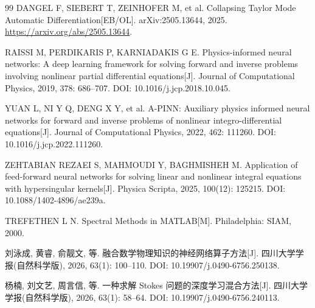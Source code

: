 \documentclass[UTF8,fontset=none,10.5pt,a4paper]{ctexart}
\numberwithin{equation}{section}
\begin{document}
\begin{thebibliography}{99}
DANGEL F, SIEBERT T, ZEINHOFER M, et al. Collapsing Taylor Mode Automatic Differentiation[EB/OL]. arXiv:2505.13644, 2025. \url{https://arxiv.org/abs/2505.13644}.

RAISSI M, PERDIKARIS P, KARNIADAKIS G E. Physics-informed neural networks: A deep learning framework for solving forward and inverse problems involving nonlinear partial differential equations[J]. Journal of Computational Physics, 2019, 378: 686--707. DOI: 10.1016/j.jcp.2018.10.045.

YUAN L, NI Y Q, DENG X Y, et al. A-PINN: Auxiliary physics informed neural networks for forward and inverse problems of nonlinear integro-differential equations[J]. Journal of Computational Physics, 2022, 462: 111260. DOI: 10.1016/j.jcp.2022.111260.

ZEHTABIAN REZAEI S, MAHMOUDI Y, BAGHMISHEH M. Application of feed-forward neural networks for solving linear and nonlinear integral equations with hypersingular kernels[J]. Physica Scripta, 2025, 100(12): 125215. DOI: 10.1088/1402-4896/ae239a.

TREFETHEN L N. Spectral Methods in MATLAB[M]. Philadelphia: SIAM, 2000.

刘泳成, 黄睿, 俞靓文, 等. 融合数学物理知识的神经网络算子方法[J]. 四川大学学报(自然科学版), 2026, 63(1): 100--110. DOI: 10.19907/j.0490-6756.250138.

杨楠, 刘文艺, 周言信, 等. 一种求解 Stokes 问题的深度学习混合方法[J]. 四川大学学报(自然科学版), 2026, 63(1): 58--64. DOI: 10.19907/j.0490-6756.240113.

\end{thebibliography}
\end{document}
